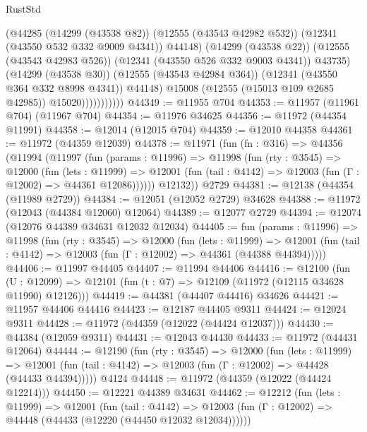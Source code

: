 \begin{lexlean}{RustStd}
\begin{coremodule}
                              (@44285
                                (@14299 (@43538 @82))
                                (@12555 (@43543 @42982 @532))
                                (@12341 (@43550 @532 @332 @9009 @4341))
                                @44148)
                              (@14299 (@43538 @22))
                              (@12555 (@43543 @42983 @526))
                              (@12341 (@43550 @526 @332 @9003 @4341))
                              @43735)
                            (@14299 (@43538 @30))
                            (@12555 (@43543 @42984 @364))
                            (@12341 (@43550 @364 @332 @8998 @4341))
                            @44148)
                          @15008
                          (@12555 (@15013 @109 @2685 @42985))
                          @15020)))))))))))
@44349 := @11955 @704
@44353 := @11957 (@11961 @704) (@11967 @704)
@44354 := @11976 @34625
@44356 := @11972 (@44354 @11991)
@44358 := @12014 (@12015 @704)
@44359 := @12010 @44358
@44361 := @11972 (@44359 @12039)
@44378 := @11971
    (fun (fn : @316) =>
    @44356
      (@11994
        (@11997
          (fun (params : @11996) =>
          @11998
            (fun (rty : @3545) =>
            @12000
              (fun (lets : @11999) =>
              @12001 (fun (tail : @4142) => @12003 (fun (Γ : @12002) => @44361 @12086))))))
        @12132))
    @2729
@44381 := @12138 (@44354 (@11989 @2729))
@44384 := @12051 (@12052 @2729) @34628
@44388 := @11972 (@12043 (@44384 @12060) @12064)
@44389 := @12077 @2729
@44394 := @12074 (@12076 @44389 @34631 @12032 @12034)
@44405 := fun (params : @11996) =>
  @11998
    (fun (rty : @3545) =>
    @12000
      (fun (lets : @11999) =>
      @12001 (fun (tail : @4142) => @12003 (fun (Γ : @12002) => @44361 (@44388 @44394)))))
@44406 := @11997 @44405
@44407 := @11994 @44406
@44416 := @12100
    (fun (U : @12099) => @12101 (fun (t : @7) => @12109 (@11972 (@12115 @34628 @11990) @12126)))
@44419 := @44381 (@44407 @44416) @34626
@44421 := @11957 @44406 @44416
@44423 := @12187 @44405 @9311
@44424 := @12024 @9311
@44428 := @11972 (@44359 (@12022 (@44424 @12037)))
@44430 := @44384 (@12059 @9311)
@44431 := @12043 @44430
@44433 := @11972 (@44431 @12064)
@44444 := @12190
    (fun (rty : @3545) =>
    @12000
      (fun (lets : @11999) =>
      @12001 (fun (tail : @4142) => @12003 (fun (Γ : @12002) => @44428 (@44433 @44394)))))
    @4124
@44448 := @11972 (@44359 (@12022 (@44424 @12214)))
@44450 := @12221 @44389 @34631
@44462 := @12212
    (fun (lets : @11999) =>
    @12001
      (fun (tail : @4142) =>
      @12003 (fun (Γ : @12002) => @44448 (@44433 (@12220 (@44450 @12032 @12034))))))

\end{coremodule}
\end{lexlean}

